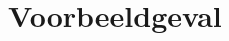 \documentclass[12pt,a4paper]{article}
\begin{document}


\tableofcontents
\listoffigures
\listoftables
\listofalgorithms
\pagebreak


\pagestyle{fancy}







\newpage
\appendix
\section{Voorbeeldgeval}
\begin{figure}[H]
   \centering
   
\end{figure}
\end{document}
